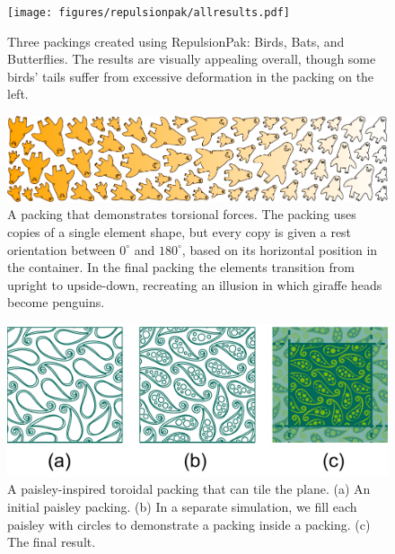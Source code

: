 \begin{figure}
\centering
\texttt{[image: figures/repulsionpak/allresults.pdf]} 
\caption[Three packings created using RepulsionPak: Birds, Bats, and Butterflies]
{\label{three_packings} Three packings created using RepulsionPak: \newline Birds, Bats, and Butterflies. The results are visually appealing overall,
though some birds' tails suffer from excessive deformation in
the packing on the left.}
\end{figure}

\begin{figure}
\centering
\includegraphics[width=1.0\textwidth]{figures/repulsionpak/giraffe_penguin.pdf}
\caption[A packing that demonstrates torsional forces]
{\label{giraffe_penguin_packing}
A packing that demonstrates torsional forces.
The packing uses copies of a single element shape, but every copy is given a rest orientation between $0^\circ$
and $180^\circ$, based on its horizontal position in the container.  In the final packing the elements transition
from upright to upside-down, recreating an illusion in which giraffe heads become penguins.}
\end{figure}

\begin{figure}
\centering
\includegraphics[width=0.95\columnwidth]{figures/repulsionpak/paisley_new.pdf} 
\vspace{-10pt}
\caption[A paisley-inspired toroidal packing that can tile the plane]
{\label{paisley_packing}
A paisley-inspired toroidal packing that can tile the plane. 
           (a) An initial paisley packing.
           (b) In a separate simulation, we fill each paisley with circles to demonstrate a packing inside a packing.
           (c) The final result.
}
\end{figure}

